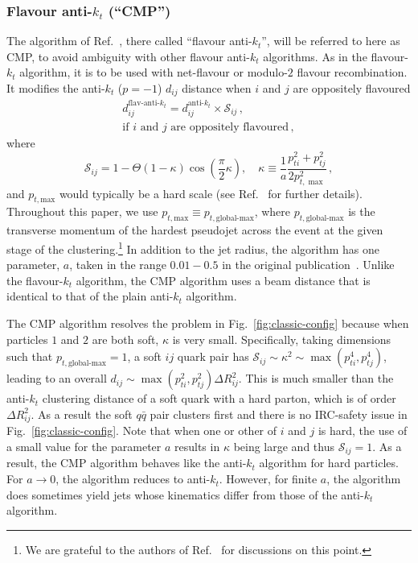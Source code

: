 \documentclass[nofootinbib,twocolumn,preprintnumbers,superscriptaddress,aps]{revtex4-2}
\begin{document}
\subsubsection{Flavour anti-$k_t$ (``CMP'')}

The algorithm of Ref.~\cite{Czakon:2022wam}, there called ``flavour
anti-$k_t$'', will be referred to here as CMP, to avoid ambiguity with
other flavour anti-$k_t$ algorithms.
%
As in the flavour-$k_t$ algorithm, it is to be used with net-flavour
or modulo-$2$ flavour recombination.
%
It modifies the anti-$k_t$ ($p=-1$) $d_{ij}$ distance
when $i$ and $j$ are oppositely flavoured
\begin{multline}
  \label{eq:flav-antikt-dij}
  d_{ij}^\text{flav-anti-$k_t$} =
  d_{ij}^\text{anti-$k_t$}
  \times
  \mathcal{S}_{ij}\,,
  \\
  \text{if $i$ and $j$ are oppositely flavoured}\,,
\end{multline}
where
\begin{equation}
  \label{eq:flav-antikt-Sij}
  \mathcal{S}_{ij}
  = 1 - \Theta(1-\kappa)\cos\left(\frac{\pi}{2}\kappa\right),
  \quad
  \kappa
    \equiv \frac{1}{a} \frac{p_{ti}^2 + p_{tj}^2}{2p_{t,\max}^2}\,,
\end{equation}
and $p_{t,\text{max}}$ would typically be a hard scale (see
Ref.~\cite{Czakon:2022wam} for further details).
%
Throughout this paper, we  use
$p_{t,\text{max}} \equiv p_{t,\text{global-max}}$, where
$p_{t,\text{global-max}}$ is the transverse momentum of the hardest
pseudojet across the event at the given stage of the clustering.\footnote{We are grateful to the
  authors of Ref.~\cite{Czakon:2022wam} for discussions on this
  point.}
%
In addition to the jet radius, the algorithm has one parameter, $a$,
taken in the range $0.01{-}0.5$ in the original
publication~\cite{Czakon:2022wam}.
%
Unlike the flavour-$k_t$ algorithm, the CMP algorithm uses a beam
distance that is identical to that of the plain anti-$k_t$ algorithm.

The CMP algorithm resolves the problem in Fig.~\ref{fig:classic-config}
because when particles $1$ and $2$ are both soft, $\kappa$ is very
small.
%
Specifically, taking dimensions such that $p_{t,\text{global-max}}=1$,
a soft $ij$ quark pair has
$\mathcal{S}_{ij} \sim \kappa^2 \sim \max(p_{ti}^4,p_{tj}^4)$, leading to an
overall $d_{ij} \sim \max(p_{ti}^2,p_{tj}^2) \Delta R^2_{ij}$.
%
This is much smaller than the anti-$k_t$ clustering distance of a soft
quark with a hard parton, which is of order $\Delta R^2_{ij}$. 
%
As a result the soft $q\bar q$ pair clusters first and there is no
IRC-safety issue in Fig.~\ref{fig:classic-config}. 
%
Note that when one or other of $i$ and $j$ is hard, the use of a small
value for the parameter $a$ results in $\kappa$ being large and thus
$\mathcal{S}_{ij}=1$.
%
As a result, the CMP algorithm behaves like the anti-$k_t$ algorithm
for hard particles.
%
For $a \to 0$, the algorithm reduces to anti-$k_t$.
%
However, for finite $a$, the algorithm does sometimes yield jets whose
kinematics differ from those of the anti-$k_t$
algorithm. 
\end{document}
